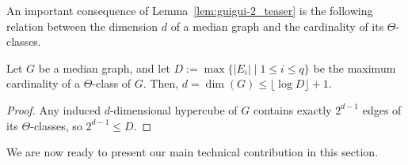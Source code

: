 \documentclass[a4paper,UKenglish,numberwithinsect,cleveref, autoref]{lipics-v2021}
\begin{document}
An important consequence of Lemma~\ref{lem:guigui-2_teaser} is the following relation between the dimension $d$ of a median graph and the cardinality of its $\Theta$-classes.

\begin{lemma}\label{lem:guigui-3_teaser}
Let $G$ be a median graph, and let $D := \max\{ |E_i| \mid 1 \leq i \leq q\}$ be the maximum cardinality of a $\Theta$-class of $G$. Then, $d = \dim(G) \leq \lfloor\log{D}\rfloor + 1$.
\end{lemma}
\begin{proof}
Any induced $d$-dimensional hypercube of $G$ contains exactly $2^{d-1}$ edges of its $\Theta$-classes, so $2^{d-1}\le D$.
\end{proof}

We are now ready to present our main technical contribution in this section.
\end{document}
